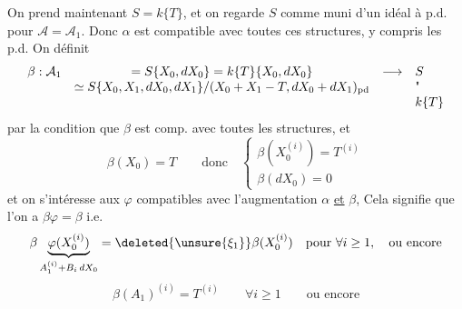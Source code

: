 On prend maintenant $S=k\{T\}$, et
on regarde $S$ comme muni d'un idéal à
p.d.  pour $\mathcal A=\mathcal A_1$. Donc $\alpha$ est
compatible avec toutes ces structures, y
compris les p.d. On définit
\[
\begin{array}{rcll}
\beta:\mathcal A_1&=S\{X_0,dX_0\}=k\{T\}\{X_0,dX_0\}&\longrightarrow&S\\
&\simeq S\{X_0,X_1,dX_0,dX_1\}/(X_0+X_1-T,dX_0+dX_1)_{\mathrm{pd}}&&\text{\textquotedbl}\\
&&&k\{T\}
\end{array}
\]
par la condition que $\beta$ est comp. avec
toutes les structures, et
\[
\beta(X_0)=T\qquad\text{donc}\quad
\begin{cases}\beta(X_0^{(i)})=T^{(i)}\\\beta(dX_0)=0\end{cases}
\]
et on s'intéresse aux $\varphi$  compatibles
avec l'augmentation $\alpha$ \uline{et} $\beta$, Cela
signifie que l'on a $\beta\varphi=\beta$ i.e.
\[
\beta\underbrace{\varphi(X_0^{(i)})}_{A_1^{(i)}+B_i\,dX_0}
=\deleted{\unsure{\xi_1}}\beta(X_0^{(i)})\quad\text{pour }\forall i\geq1,\quad\text{ou encore}
\]
\[
\beta(A_1)^{(i)}=T^{(i)}\qquad\forall i\geq1\qquad\text{ou encore}
\]
